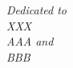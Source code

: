 \begin{titlepage}
 \vspace*{\fill}
 \begin{center}
  {\Large \textit{Dedicated to \\
  XXX\\
  AAA and  \\
  BBB}}\\
 \end{center}
 \vspace*{\fill}
\end{titlepage}
